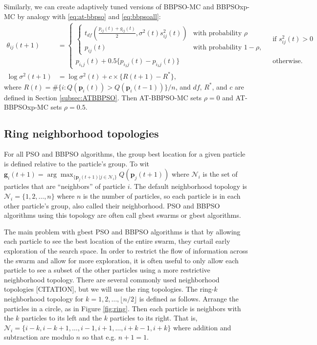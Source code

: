 \documentclass[12pt]{article}
\begin{document}
Similarly, we can create adaptively tuned versions of BBPSO-MC and BBPSOxp-MC by analogy with \eqref{eq:at-bbpso} and \eqref{eq:bbpsoall}:
\begin{align*}%
\theta_{ij}(t+1) &= 
  \begin{cases} 
    \begin{cases} t_{df}\left(\frac{p_{ij}(t) + g_{ij}(t)}{2}, \sigma^2(t)s^2_{ij}(t)\right) & \mbox{with probability } \rho\\
      p_{ij}(t) & \mbox{with probability } 1 - \rho,
    \end{cases}
    & \mbox{ if } s^2_{ij}(t) > 0\\
    p_{i_1j}(t) + 0.5\{p_{i_2j}(t) - p_{i_3j}(t)\} & \mbox{ otherwise.}
  \end{cases}\\
\log\sigma^2(t+1) &= \log\sigma^2(t) + c\times\{R(t+1) - R^*\},
\end{align*}
where $R(t)=\#\{i:Q(\bm{p}_i(t))> Q(\bm{p}_i(t-1))\}/n$, and $df$, $R^*$, and $c$ are defined in Section \ref{subsec:ATBBPSO}. Then AT-BBPSO-MC sets $\rho=0$ and AT-BBPSOxp-MC sets $\rho=0.5$.

\subsection{Ring neighborhood topologies}
For all PSO and BBPSO algorithms, the group best location for a given particle is defined relative to the particle's group. To wit $\bm{g}_i(t+1) = \arg\max_{\{\bm{p}_j(t+1)|j\in\mathcal{N}_i\}}Q(\bm{p}_j(t+1))$ where $\mathcal{N}_i$ is the set of particles that are ``neighbors'' of particle $i$. The default neighborhood topology is $\mathcal{N}_i = \{1, 2, \dots, n\}$ where $n$ is the number of particles, so each particle is in each other particle's group, also called their neighborhood. PSO and BBPSO algorithms using this topology are often call gbest swarms or gbest algorithms. 

The main problem with gbest PSO and BBPSO algorithms is that by allowing each particle to see the best location of the entire swarm, they curtail early exploration of the search space. In order to restrict the flow of information across the swarm and allow for more exploration, it is often useful to only allow each particle to see a subset of the other particles using a more restrictive neighborhood topology. There are several commonly used neighborhood topologies [CITATION], but we will use the ring topologies. The ring-$k$ neighborhood topology for $k=1,2,\dots,\lfloor n/2\rfloor$ is defined as follows. Arrange the particles in a circle, as in Figure \ref{fig:ring}. Then each particle is neighbors with the $k$ particles to its left and the $k$ particles to its right. That is, $\mathcal{N}_i = \{i-k, i-k+1, \dots, i-1, i+1, \dots, i+k-1, i+k\}$ where addition and subtraction are modulo $n$ so that e.g. $n + 1 = 1$.
\end{document}
